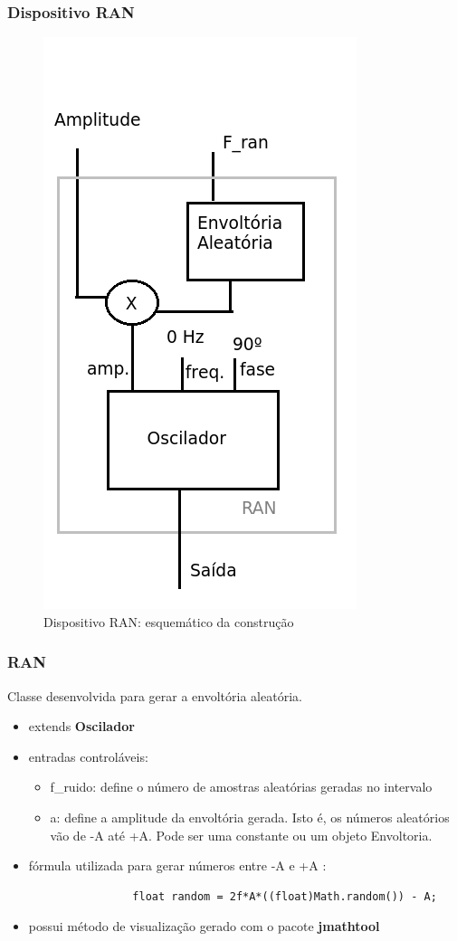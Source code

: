 \documentclass{beamer}
\begin{document}
\begin{frame}
 \frametitle{Dispositivo RAN}
 \begin{figure}
  \includegraphics[scale=0.3]{./images/RAN.png}
  \caption{Dispositivo RAN: esquemático da construção}
   \end{figure}
\end{frame}

\begin{frame}[fragile]
	\frametitle{RAN}
Classe desenvolvida para gerar a envoltória aleatória.	
	\begin{itemize}
		\item extends \textbf{Oscilador}
		\item entradas controláveis: 
		\begin{itemize}
			\item f\_ruido: define o número de amostras aleatórias geradas no intervalo
			\item a: define a amplitude da envoltória gerada. Isto é, os números aleatórios vão de -A até +A. Pode ser uma constante ou um objeto Envoltoria.
		\end{itemize}
		\item fórmula utilizada para gerar números entre -A e +A :
		\begin{tiny}	\begin{lstlisting}
				float random = 2f*A*((float)Math.random()) - A;		    				
		\end{lstlisting} \end{tiny}	
		
		\item possui método de visualização gerado com o pacote \textbf{jmathtool}			
	\end{itemize}
\end{frame}
\end{document}
